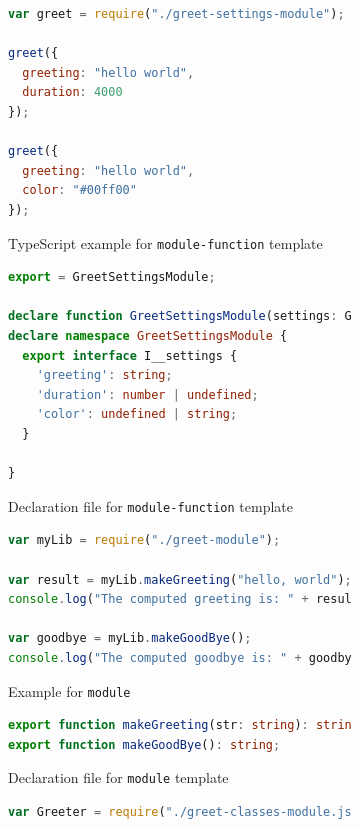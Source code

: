 \documentclass[a4paper,english,cleveref, autoref]{lipics-v2019}
\begin{document}
\begin{figure}[tp]
  \centering
  \begin{subfigure}{0.48\linewidth}
    \begin{lstlisting}[language=JavaScript]
var greet = require("./greet-settings-module");

greet({
  greeting: "hello world",
  duration: 4000
});

greet({
  greeting: "hello world",
  color: "#00ff00"
});
    \end{lstlisting}
    \caption{TypeScript example for \texttt{module-function} template}
  \end{subfigure}
  \hfill
  \begin{subfigure}{0.48\linewidth}
    \begin{lstlisting}[language=TypeScript]
export = GreetSettingsModule;

declare function GreetSettingsModule(settings: GreetSettingsModule.I__settings): void;
declare namespace GreetSettingsModule {
  export interface I__settings {
    'greeting': string;
    'duration': number | undefined;
    'color': undefined | string;
  }

}
    \end{lstlisting}
    \caption{Declaration file for \texttt{module-function} template}
  \end{subfigure}

  \begin{subfigure}{0.48\linewidth}
      \begin{lstlisting}[language=JavaScript]
var myLib = require("./greet-module");

var result = myLib.makeGreeting("hello, world");
console.log("The computed greeting is: " + result);

var goodbye = myLib.makeGoodBye();
console.log("The computed goodbye is: " + goodbye);    
      \end{lstlisting}
      \caption{Example for \texttt{module}}
    \end{subfigure}
    \hfill
    \begin{subfigure}{0.48\linewidth}
      \begin{lstlisting}[language=TypeScript]
export function makeGreeting(str: string): string;
export function makeGoodBye(): string;        
      \end{lstlisting}
      \caption{Declaration file for \texttt{module} template}
    \end{subfigure}

    \begin{subfigure}{0.48\linewidth}
      \begin{lstlisting}[language=JavaScript]
var Greeter = require("./greet-classes-module.js");


\end{lstlisting}
\end{subfigure}
\end{figure}
\end{document}
